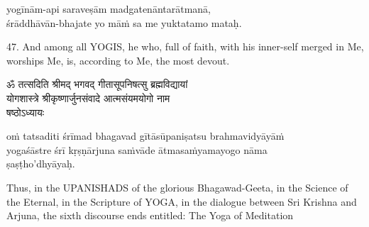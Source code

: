 \begin{transliteration}
yogīnām-api saraveṣām madgatenāntarātmanā, \\
śrāddhāvān-bhajate yo māṁ sa me yuktatamo mataḥ.
\end{transliteration}

47. And among all YOGIS, he who, full of faith, with his inner-self merged in
Me, worships Me, is, according to Me, the most devout.

\begin{gitaverse}
ॐ तत्सदिति श्रीमद् भगवद् गीतासूपनिषत्सु ब्रह्मविद्यायां \\
योगशास्त्रे श्रीकृष्णार्जुनसंवादे आत्मसंयमयोगो नाम \\
षष्ठोऽध्यायः
\end{gitaverse}

\begin{transliteration}
oṁ tatsaditi śrīmad bhagavad gītāsūpaniṣatsu brahmavidyāyāṁ \\
yogaśāstre śrī kṛṣṇārjuna saṁvāde ātmasaṁyamayogo nāma \\
ṣaṣṭho'dhyāyaḥ.
\end{transliteration}

Thus, in the UPANISHADS of the glorious Bhagawad-Geeta, in the Science of the
Eternal, in the Scripture of YOGA, in the dialogue between Sri Krishna and
Arjuna, the sixth discourse ends entitled: The Yoga of Meditation
